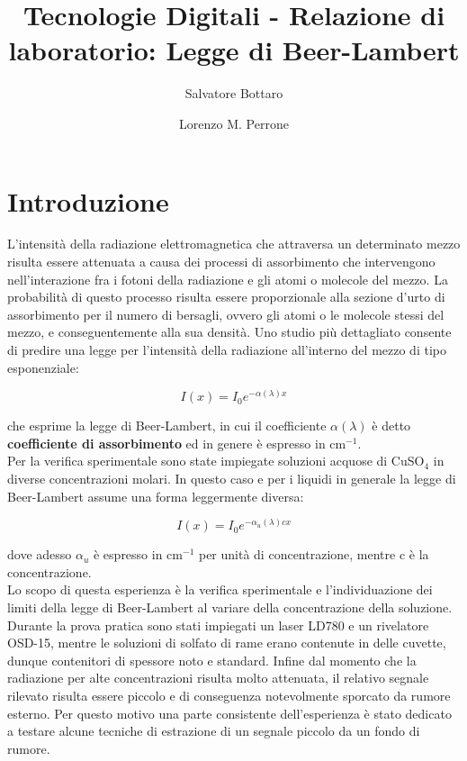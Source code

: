 \documentclass[a4paper]{article}
\begin{document}
\title{Tecnologie Digitali - Relazione di laboratorio: Legge di Beer-Lambert}
	\author[1]{Salvatore Bottaro}
		\author[2]{Lorenzo M. Perrone}
	\maketitle

\section{Introduzione}

L'intensità della radiazione elettromagnetica che attraversa un determinato mezzo risulta essere attenuata a causa dei processi di assorbimento  che intervengono nell'interazione fra i fotoni della radiazione e gli atomi o molecole del mezzo. La probabilità di questo processo risulta essere proporzionale alla sezione d'urto di assorbimento per il numero di bersagli, ovvero gli atomi o le molecole stessi del mezzo, e conseguentemente alla sua densità. Uno studio più dettagliato consente di predire una legge per l'intensità della radiazione all'interno del mezzo di tipo esponenziale:

\begin{equation}
I(x) = I_0 e^{-\alpha (\lambda) x}
\end{equation}

che esprime la legge di Beer-Lambert, in cui il coefficiente $\alpha(\lambda)$ è detto \textbf{coefficiente di assorbimento} ed in genere è espresso in cm$^{-1}$.\\
Per la verifica sperimentale sono state impiegate soluzioni acquose di CuSO$_4$ in diverse concentrazioni molari. In questo caso e per i liquidi in generale la legge di Beer-Lambert assume una forma leggermente diversa:

\begin{equation}
I(x) = I_0 e^{-\alpha _u(\lambda) cx}
\end{equation}

dove adesso $\alpha _u$ è espresso in cm$^{-1}$ per unità di concentrazione, mentre c è la concentrazione.\\
Lo scopo di questa esperienza è la verifica sperimentale e l'individuazione dei limiti della legge di Beer-Lambert al variare della concentrazione della soluzione. Durante la prova pratica sono stati impiegati un laser LD780
e un rivelatore OSD-15, mentre le soluzioni di solfato di rame erano contenute in delle cuvette, dunque contenitori di spessore noto e standard. Infine dal momento che la radiazione per alte concentrazioni risulta molto attenuata, il relativo segnale rilevato risulta essere piccolo e di conseguenza notevolmente sporcato da rumore esterno. Per questo motivo una parte consistente dell'esperienza è stato dedicato a testare alcune tecniche di estrazione di un segnale piccolo da un fondo di rumore.
\end{document}
